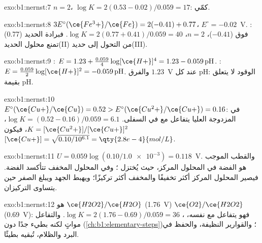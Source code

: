 \begin{solution}{exo:b1:nernst:7}
$n = 2$، $\log K = 2(0.53 - 0.02)/0.059 = 17$: كمّي.
\end{solution}

\begin{solution}{exo:b1:nernst:8}
$3E^\circ(\ce{Fe^3+}/\ce{Fe}) = 2(-0.41) + 0.77$، $E^\circ = -0.02$~V.
:   (0.77) فوق 
 ($-0.41$)، $n = 2$، $\log K = 2(0.77 + 0.41)/0.059 = 40$. فبرادة
الحديد تمنع محلول الحديد(II) من التحول إلى حديد(III).
\end{solution}

\begin{solution}{exo:b1:nernst:9}
: $E = 1.23 + \frac{0.059}{4}\log [\ce{H+}]^4 =
1.23 - 0.059\,\mathrm{pH}$. : $E = \frac{0.059}{2}\log
[\ce{H+}]^2 = -0.059\,\mathrm{pH}$. والفرق $1.23$~V عند كل pH:
 الوقود لا يتعلق بقيمة pH.
\end{solution}

\begin{solution}{exo:b1:nernst:10}
$E^\circ(\ce{Cu+}/\ce{Cu}) = 0.52 > E^\circ(\ce{Cu^2+}/\ce{Cu+}) = 0.16$:
  في المزدوجة العليا يتفاعل مع   في
السفلى. $\log K = (0.52 - 0.16)/0.059 = 6.1$، $K =
[\ce{Cu^2+}]/[\ce{Cu+}]^2$، فيكون $[\ce{Cu+}] = \sqrt{0.10/10^{6.1}} =
\qty{2.8e-4}{mol/L}$.
\end{solution}

\begin{solution}{exo:b1:nernst:11}
$U = 0.059\log(0.10/\num{1.0e-3}) = 0.118$~V. والقطب الموجب هو
الفضة في المحلول المركز، حيث يُختزل ؛ وفي المحلول
المخفف تتأكسد الفضة. فيصير المحلول المركز
أكثر تخفيفًا والمخفف أكثر تركيزًا؛ ويهبط الجهد
ويبلغ الصفر حين يتساوى التركيزان.
\end{solution}

\begin{solution}{exo:b1:nernst:12}
 هو  $\ce{H2O2}/\ce{H2O}$ (1.76~V) 
$\ce{O2}/\ce{H2O2}$ (0.69~V): فهو يتفاعل مع نفسه، ،
$\log K = 2(1.76 - 0.69)/0.059 = 36$. والتفاعل مواتٍ لكنه بطيء جدًا
دون  (\cref{ch:b1:elementary-steps})؛ والقوارير النظيفة، والحفظ
في البرد والظلام، تُبقيه بطيئًا.
\end{solution}

